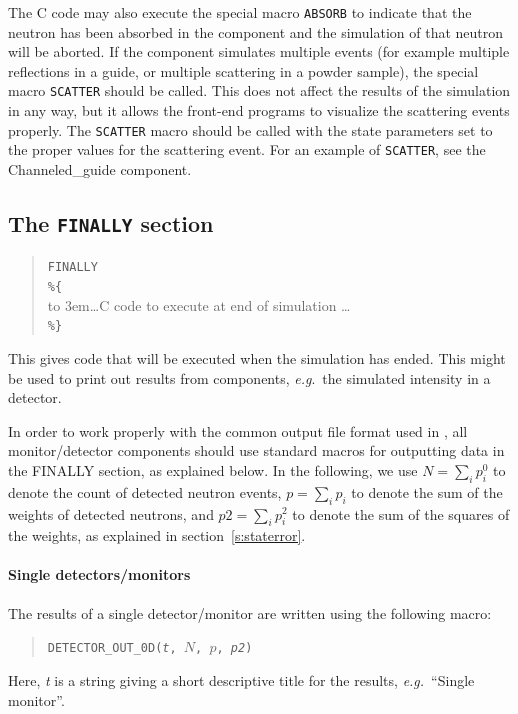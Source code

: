 {The C code may also execute the special macro \texttt{ABSORB} to
indicate that the neutron has been absorbed in the component and the
simulation of that neutron will be aborted. If the component
simulates multiple events (for example multiple reflections in a guide,
or multiple scattering in a powder sample), the special macro
\texttt{SCATTER} should be called. This does not affect the results of
the simulation in any way, but it allows the front-end programs to
visualize the scattering events properly. The \texttt{SCATTER} macro
should be called with the state parameters set to the proper values for
the scattering event. For an example of \texttt{SCATTER}, see the
Channeled\_guide component.


\subsection{The \texttt{FINALLY} section}
\label{s:comp-finally}

\begin{quote}
  \texttt{FINALLY} \\
  \verb|%{| \\
  \hbox to 3em{}\ldots C code to execute at end of simulation \ldots \\
  \verb|%}|
\end{quote}
This gives code that will be executed when the simulation has
ended. This might be used to print out results from components, \textit{e.g}.\ the
simulated intensity in a detector.

In order to work properly with the common output file format used in
\MCS, all monitor/detector components should use standard macros for
outputting data in the FINALLY section, as explained below. In the
following, we use $N = \sum_i p_i^0$ to denote the count of detected
neutron events, $p = \sum_i p_i$ to denote the sum of the weights of
detected neutrons, and $\textit{p2} = \sum_i p_i^2$ to denote the sum of
the squares of the weights, as explained in section~\ref{s:staterror}.

\paragraph{Single detectors/monitors}
\label{s:DETECTOR_OUT}

The results of a single detector/monitor are written using the following
macro:
\begin{quote}
  \texttt{DETECTOR\_OUT\_0D({\it t}, $N$, $p$, {\it p2})}
\end{quote}
Here, \textit{t} is a string giving a short descriptive title for the
results, {\em e.g.}\ ``Single monitor''.


}
